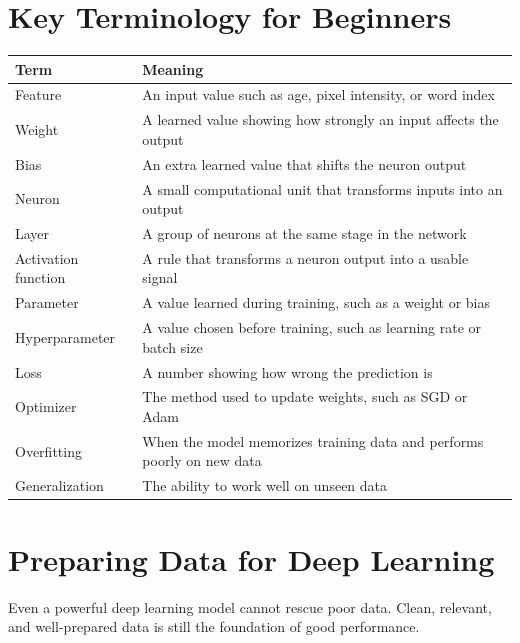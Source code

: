 \documentclass[11pt,a4paper]{article}
\begin{document}
\section{Key Terminology for Beginners}

\begin{longtable}{@{}p{3.5cm}p{10cm}@{}}
\toprule
\rowcolor{primary!15}
\textbf{Term} & \textbf{Meaning} \\
\midrule
\endhead
Feature & An input value such as age, pixel intensity, or word index \\
\addlinespace
Weight & A learned value showing how strongly an input affects the output \\
\addlinespace
Bias & An extra learned value that shifts the neuron output \\
\addlinespace
Neuron & A small computational unit that transforms inputs into an output \\
\addlinespace
Layer & A group of neurons at the same stage in the network \\
\addlinespace
Activation function & A rule that transforms a neuron output into a usable signal \\
\addlinespace
Parameter & A value learned during training, such as a weight or bias \\
\addlinespace
Hyperparameter & A value chosen before training, such as learning rate or batch size \\
\addlinespace
Loss & A number showing how wrong the prediction is \\
\addlinespace
Optimizer & The method used to update weights, such as SGD or Adam \\
\addlinespace
Overfitting & When the model memorizes training data and performs poorly on new data \\
\addlinespace
Generalization & The ability to work well on unseen data \\
\bottomrule
\end{longtable}

\section{Preparing Data for Deep Learning}

\begin{conceptbox}
Even a powerful deep learning model cannot rescue poor data. Clean, relevant, and well-prepared data is still the foundation of good performance.
\end{conceptbox}
\end{document}
